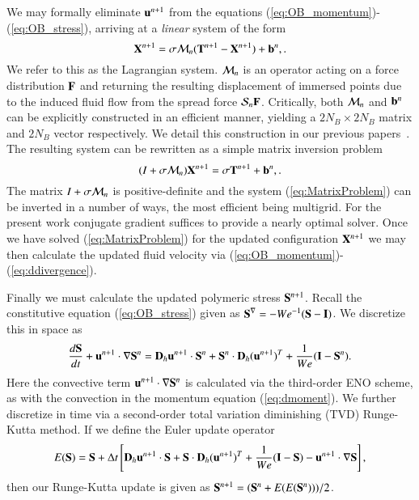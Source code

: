 We may formally eliminate $\mathbf{u}^{n+1}$ from the equations (\ref{eq:OB_momentum})-(\ref{eq:OB_stress}), arriving at a {\em linear} system of the form
\begin{equation}
\mathbf{X}^{n+1} = \sigma\mathcal{M}_n(\mathbf{T}^{n+1} - \mathbf{X}^{n+1}) + \mathbf{b}^n, \label{eq:LagrangianSystem}.
\end{equation}
We refer to this as the Lagrangian system. $\mathcal{M}_n$ is an operator acting on a force distribution $\mathbf{F}$ and returning the resulting displacement of immersed points due to the induced fluid flow from the spread force $\mathcal{S}_n\mathbf{F}$. Critically, both $\mathcal{M}_n$ and $\mathbf{b}^n$ can be explicitly constructed in an efficient manner, yielding a $2N_B\times 2N_B$ matrix and $2N_B$ vector respectively. We detail this construction in our previous papers~\cite{IBM_Implicit2D, IBM_Implicit3D}. The resulting system can be rewritten as a simple matrix inversion problem
\begin{equation}
(I + \sigma\mathcal{M}_n)\mathbf{X}^{n+1} = \sigma \mathbf{T}^{n+1} + \mathbf{b}^n, \label{eq:MatrixProblem}.
\end{equation}
The matrix $I + \sigma\mathcal{M}_n$ is positive-definite and the system (\ref{eq:MatrixProblem}) can be inverted in a number of ways, the most efficient being multigrid. For the present work conjugate gradient suffices to provide a nearly optimal solver. Once we have solved (\ref{eq:MatrixProblem}) for the updated configuration $\mathbf{X}^{n+1}$ we may then calculate the updated fluid velocity via (\ref{eq:OB_momentum})-(\ref{eq:ddivergence}).


Finally we must calculate the updated polymeric stress $\mathbf{S}^{n+1}$. Recall the constitutive equation (\ref{eq:OB_stress}) given as $\mathbf{S}^\nabla = -{We}^{-1}(\mathbf{S} - \mathbf{I})$. We discretize this in space as
\begin{equation}
\frac{d\mathbf{S}}{dt} + \mathbf{u}^{n+1}\cdot\nabla\mathbf{S}^n
 = \mathbf{D}_h \mathbf{u}^{n+1} \cdot \mathbf{S}^n + \mathbf{S}^n \cdot \mathbf{D}_h(\mathbf{u}^{n+1})^T + \frac{1}{We}(\mathbf{I} - \mathbf{S}^n).
\end{equation}
Here the convective term $\mathbf{u}^{n+1}\cdot\nabla\mathbf{S}^n$ is calculated via the third-order ENO scheme, as with the convection in the momentum equation (\ref{eq:dmoment}). We further discretize in time via a second-order total variation diminishing (TVD) Runge-Kutta method. If we define the Euler update operator
\begin{equation}
E(\mathbf{S}) = \mathbf{S} + \Delta t \left[\mathbf{D}_h \mathbf{u}^{n+1} \cdot \mathbf{S} + \mathbf{S} \cdot \mathbf{D}_h(\mathbf{u}^{n+1})^T + \frac{1}{We}(\mathbf{I} - \mathbf{S}) - \mathbf{u}^{n+1}\cdot\nabla\mathbf{S}\right],
\end{equation}
then our Runge-Kutta update is given as $\mathbf{S}^{n+1} = (\mathbf{S}^n + E(E(\mathbf{S}^n))) / 2$.

